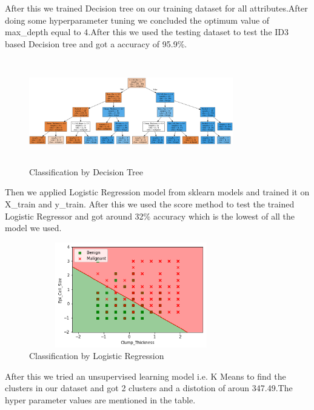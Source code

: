 \documentclass[conference,compsoc]{IEEEtran}
\begin{document}
\par
After this we trained Decision tree on our training dataset for all attributes.After doing some hyperparameter tuning we concluded the optimum value of max\_depth equal to 4.After this we used the testing dataset to test the ID3 based Decision tree and got a accuracy of 95.9\%.
\begin{figure}[H]
\centering
\includegraphics[width=3.5in,height=1.8in]{DecisionTree.png}
\caption{Classification by Decision Tree}
\label{fig_error}

\end{figure}  
\par
Then we applied Logistic Regression model from sklearn models and trained it on  X\_train and y\_train. After this we used the score method to test the trained Logistic Regressor and got around 32\% accuracy which is the lowest of all the model we used.
\begin{figure}[H]
\centering
\includegraphics[width=3.5in,height=1.8in]{lr2.png}
\caption{Classification by Logistic Regression}
\label{fig_error}

\end{figure}  
\par
After this we tried an unsupervised learning model i.e. K Means to
find the clusters in our dataset and got 2 clusters and a distotion of aroun 347.49.The hyper parameter values  are mentioned in the table.
\end{document}
